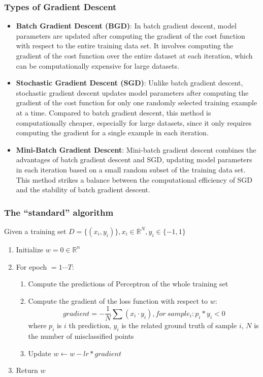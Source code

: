 \documentclass{article}
\begin{document}
\subsubsection{Types of Gradient Descent}
\begin{itemize}
    \item \textbf{Batch Gradient Descent (BGD)}: In batch gradient descent, model parameters are updated after computing the gradient of the cost function with respect to the entire training data set. It involves computing the gradient of the cost function over the entire dataset at each iteration, which can be computationally expensive for large datasets.

    \item \textbf{Stochastic Gradient Descent (SGD)}: Unlike batch gradient descent, stochastic gradient descent updates model parameters after computing the gradient of the cost function for only one randomly selected training example at a time. Compared to batch gradient descent, this method is computationally cheaper, especially for large datasets, since it only requires computing the gradient for a single example in each iteration.

    \item \textbf{Mini-Batch Gradient Descent}: Mini-batch gradient descent combines the advantages of batch gradient descent and SGD, updating model parameters in each iteration based on a small random subset of the training data set.
    This method strikes a balance between the computational efficiency of SGD and the stability of batch gradient descent.
\end{itemize}

\subsubsection{The “standard” algorithm}
Given a training set $D = \{(x_{i},y_{i})\}, x_{i}\in \mathbb{R}^{N}, y_{i}\in \{-1,1\}$
\begin{enumerate}
    \item Initialize $w=0\in\mathbb{R}^{n}$
    \item For epoch $= 1 \cdots T:$
        \begin{enumerate}
            \item Compute the predictions of Perceptron of the whole training set
            \item Compute the gradient of the loss function with respect to $w$:
            $$gradient = -\frac{1}{N}\sum(x_{i} \cdot y_{i}), for\ sample_{i}:p_{i}*y_{i}<0$$
            where $p_{i}$ is $i$ th prediction, $y_{i}$ is the related ground truth of sample $i$, $N$ is the number of misclassified points
            \item Update $w \leftarrow w - lr * gradient$
        \end{enumerate}
    \item Return $w$
\end{enumerate}
\end{document}
